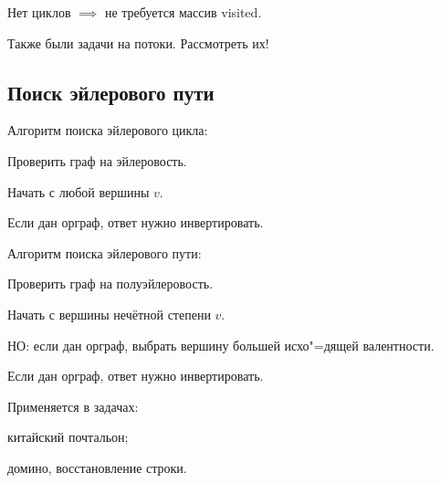Нет циклов $\implies$ не требуется массив {\ital visited}.

Также были задачи на потоки. Рассмотреть их!

\subsection{Поиск эйлерового пути}

{\bold Алгоритм} поиска эйлерового {\ital цикла}:


\begin{list*}[][\#]
\item Проверить граф на {\ital эйлеровость}.
\item Начать с любой вершины $v$.
\item Если дан орграф, ответ нужно {\ital инвертировать}.
\end{list*}

{\bold Алгоритм} поиска эйлерового {\ital пути}:


\begin{list*}[][\#]
\item Проверить граф на {\ital полуэйлеровость}.
\item Начать с вершины нечётной степени $v$.

{\bold НО:} если дан орграф, выбрать вершину большей {\ital исхо"=дящей} валентности.
\item Если дан орграф, ответ нужно {\ital инвертировать}.
\end{list*}

Применяется в {\bold задачах}:

\begin{list*}
\item китайский почтальон;
\item домино, восстановление строки.
\end{list*}

